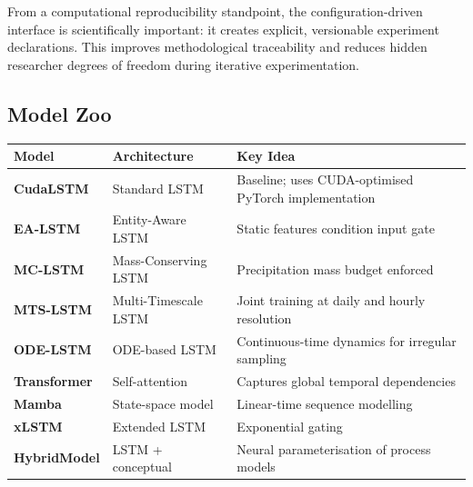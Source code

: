 \documentclass[
]{krantz}
\newcounter{none} %
\begin{document}
From a computational reproducibility standpoint, the configuration-driven interface is
scientifically important: it creates explicit, versionable experiment declarations.
This improves methodological traceability and reduces hidden researcher degrees of
freedom during iterative experimentation.

\subsection{Model Zoo}\label{nh-modelzoo}

{\def\LTcaptype{none} %
\begin{longtable}[]{@{}
  >{\raggedright\arraybackslash}p{}
  >{\raggedright\arraybackslash}p{}
  >{\raggedright\arraybackslash}p{}@{}}
\toprule\noalign{}
\begin{minipage}[b]{\linewidth}\raggedright
Model
\end{minipage} & \begin{minipage}[b]{\linewidth}\raggedright
Architecture
\end{minipage} & \begin{minipage}[b]{\linewidth}\raggedright
Key Idea
\end{minipage} \\
\midrule\noalign{}
\endhead
\bottomrule\noalign{}
\endlastfoot
\textbf{CudaLSTM} & Standard LSTM & Baseline; uses CUDA-optimised PyTorch implementation \\
\textbf{EA-LSTM} & Entity-Aware LSTM & Static features condition input gate \citep{kratzert2019} \\
\textbf{MC-LSTM} & Mass-Conserving LSTM & Precipitation mass budget enforced \citep{hoedt2021} \\
\textbf{MTS-LSTM} & Multi-Timescale LSTM & Joint training at daily and hourly resolution \citep{gauch2021} \\
\textbf{ODE-LSTM} & ODE-based LSTM & Continuous-time dynamics for irregular sampling \\
\textbf{Transformer} & Self-attention & Captures global temporal dependencies \\
\textbf{Mamba} & State-space model & Linear-time sequence modelling \citep{gu2023} \\
\textbf{xLSTM} & Extended LSTM & Exponential gating \citep{beck2024} \\
\textbf{HybridModel} & LSTM + conceptual & Neural parameterisation of process models \\
\end{longtable}
}
\end{document}
